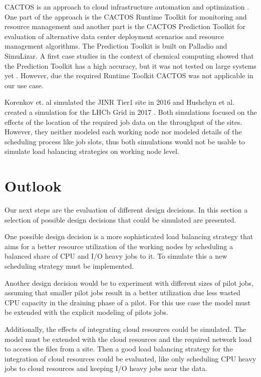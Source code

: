 \documentclass{webofc}
\begin{document}
CACTOS is an approach to cloud infrastructure automation and optimization \cite{cactos}.
One part of the approach is the CACTOS Runtime Toolkit for monitoring and resource management and another part is the CACTOS Prediction Toolkit for evaluation of alternative data center deployment scenarios and resource management algorithms. The Prediction Toolkit is built on Palladio and SimuLizar.
A first case studies in the context of chemical computing showed that the Prediction Toolkit has a high accuracy, but it was not tested on large systems yet \cite{rapidtesting}. However, due the required Runtime Toolkit CACTOS was not applicable in our use case.

Korenkov et. al simulated the JINR Tier1 site in 2016 \cite{jinr} and Hushchyn et al. created a simulation for the LHCb Grid in 2017 \cite{lhcb}. Both simulations focused on the effects of the location of the required job data on the throughput of the sites.
However, they neither modeled each working node nor modeled details of the scheduling process like job slots, thus both simulations would not be usable to simulate load balancing strategies on working node level.


\section{Outlook}
\label{outlook}
Our next steps are the evaluation of different design decisions. In this section a selection of possible design decisions that could be simulated are presented.

One possible design decision is a more sophisticated load balancing strategy that aims for a better resource utilization of the working nodes by scheduling a balanced share of CPU and I/O heavy jobs to it. To simulate this a new scheduling strategy must be implemented.

Another design decision would be to experiment with different sizes of pilot jobs, assuming that smaller pilot jobs result in a better utilization due less wasted CPU capacity in the draining phase of a pilot. For this use case the model must be extended with the explicit modeling of pilots jobs.

Additionally, the effects of integrating cloud resources could be simulated. The model must be extended with the cloud resources and the required network load to access the files from a site. Then a good load balancing strategy for the  integration of cloud resources could be evaluated, like only scheduling CPU heavy jobs to cloud resources and keeping I/O heavy jobs near the data.
\end{document}
